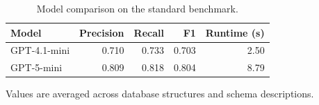 \begin{table}[htbp]
\centering
\small
\caption{Model comparison on the standard benchmark.}
\label{tab:model-comparison}
\begin{tabular}{lrrrr}
\toprule
Model & Precision & Recall & F1 & Runtime (s) \\
\midrule
GPT-4.1-mini & 0.710 & 0.733 & 0.703 & 2.50 \\
GPT-5-mini & 0.809 & 0.818 & 0.804 & 8.79 \\
\bottomrule
\end{tabular}
\par\footnotesize{Values are averaged across database structures and schema descriptions.}
\end{table}
